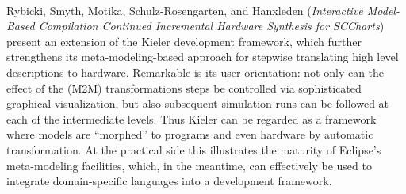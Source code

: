 


\ \hline \ %

Rybicki, Smyth, Motika,
Schulz-Rosengarten, and Hanxleden
\cite{isola-2016-rybicki}
({\em Interactive Model-Based Compilation Continued
Incremental Hardware Synthesis for SCCharts})
present an extension of the Kieler development framework, which further strengthens its meta-modeling-based approach for stepwise translating high level descriptions to hardware. Remarkable is its user-orientation: not only can the effect of the (M2M) transformations steps be controlled via sophisticated graphical visualization, but also subsequent simulation runs can be followed at each of the intermediate levels. Thus Kieler can be regarded as a framework where models are ``morphed'' to programs and even hardware  by automatic transformation. 
At the practical side this illustrates the maturity of Eclipse's meta-modeling facilities, which, in the meantime, can effectively be used to integrate domain-specific languages into a development framework.

\done{}